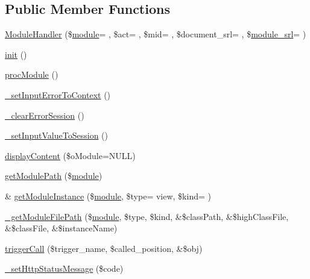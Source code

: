 \subsection*{Public Member Functions}
\begin{DoxyCompactItemize}
\item 
\hyperlink{classModuleHandler_abfb13533d16d60323823189ccca73237}{Module\+Handler} (\$\hyperlink{classmodule}{module}= \textquotesingle{}\textquotesingle{}, \$act= \textquotesingle{}\textquotesingle{}, \$mid= \textquotesingle{}\textquotesingle{}, \$document\+\_\+srl= \textquotesingle{}\textquotesingle{}, \$\hyperlink{ko_8install_8php_a370bb6450fab1da3e0ed9f484a38b761}{module\+\_\+srl}= \textquotesingle{}\textquotesingle{})
\item 
\hyperlink{classModuleHandler_a4a4671c196a893207c38af84c8ee7da8}{init} ()
\item 
\hyperlink{classModuleHandler_a74ad0ae3090eff1da5a6e0e68ce431d0}{proc\+Module} ()
\item 
\hyperlink{classModuleHandler_aa47d0ccb069d65698ade6f44bf6c705f}{\+\_\+set\+Input\+Error\+To\+Context} ()
\item 
\hyperlink{classModuleHandler_a45c91a72acccf3ee8139538ef5aa1c1d}{\+\_\+clear\+Error\+Session} ()
\item 
\hyperlink{classModuleHandler_ab3837506079a320e2726079777bb2b3e}{\+\_\+set\+Input\+Value\+To\+Session} ()
\item 
\hyperlink{classModuleHandler_a140c43faf30dedf139212294e3e9acf3}{display\+Content} (\$o\+Module=N\+U\+L\+L)
\item 
\hyperlink{classModuleHandler_a0a175bdc5034df0bf4ce66ea0e6e1bf2}{get\+Module\+Path} (\$\hyperlink{classmodule}{module})
\item 
\& \hyperlink{classModuleHandler_aea2e4d82f816ee25ec97ce2c830e6860}{get\+Module\+Instance} (\$\hyperlink{classmodule}{module}, \$type= \textquotesingle{}view\textquotesingle{}, \$kind= \textquotesingle{}\textquotesingle{})
\item 
\hyperlink{classModuleHandler_a75e1eb90149d7f6e38cfd5dc7a9521d4}{\+\_\+get\+Module\+File\+Path} (\$\hyperlink{classmodule}{module}, \$type, \$kind, \&\$class\+Path, \&\$high\+Class\+File, \&\$class\+File, \&\$instance\+Name)
\item 
\hyperlink{classModuleHandler_aa1b1f9eae91ccd76e6a81c9375c2e673}{trigger\+Call} (\$trigger\+\_\+name, \$called\+\_\+position, \&\$obj)
\item 
\hyperlink{classModuleHandler_a91c14051caea99153975f2335a2dc770}{\+\_\+set\+Http\+Status\+Message} (\$code)
\end{DoxyCompactItemize}
